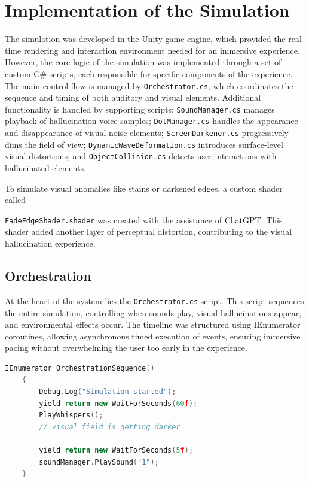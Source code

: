 \section{Implementation of the Simulation}
The simulation was developed in the Unity game engine, which provided the real-time rendering and interaction environment needed for an immersive experience. However, the core logic of the simulation was implemented through a set of custom C\# scripts, each responsible for specific components of the experience. The main control flow is managed by \texttt{Orchestrator.cs}, which coordinates the sequence and timing of both auditory and visual elements. Additional functionality is handled by supporting scripts: \texttt{SoundManager.cs} manages playback of hallucination voice samples; \texttt{DotManager.cs} handles the appearance and disappearance of visual noise elements; \texttt{ScreenDarkener.cs} progressively dims the field of view; \texttt{DynamicWaveDeformation.cs} introduces surface-level visual distortions; and \texttt{ObjectCollision.cs} detects user interactions with hallucinated elements.

To simulate visual anomalies like stains or darkened edges, a custom shader called

\texttt{FadeEdgeShader.shader} was created with the assistance of ChatGPT. This shader added another layer of perceptual distortion, contributing to the visual hallucination experience.

\subsection{Orchestration}
At the heart of the system lies the \texttt{Orchestrator.cs} script. This script sequences the entire simulation, controlling when sounds play, visual hallucinations appear, and environmental effects occur. The timeline was structured using IEnumerator coroutines, allowing asynchronous timed execution of events, ensuring immersive pacing without overwhelming the user too early in the experience.

\begin{lstlisting}[language=C++, caption={Orchestration Coroutine}, label={lst:orchestration}]
    IEnumerator OrchestrationSequence()
    {
        Debug.Log("Simulation started");
        yield return new WaitForSeconds(60f);
        PlayWhispers();
        // visual field is getting darker
    
        yield return new WaitForSeconds(5f);
        soundManager.PlaySound("1");
    }
    \end{lstlisting}
    

